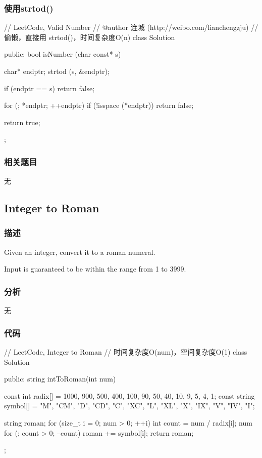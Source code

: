 \subsubsection{使用strtod()}
\begin{Code}
	// LeetCode, Valid Number
	// @author 连城 (http://weibo.com/lianchengzju)
	// 偷懒，直接用 strtod()，时间复杂度O(n)
	class Solution {
		public:
		bool isNumber (char const* s) {
			char* endptr;
			strtod (s, &endptr);
			
			if (endptr == s) return false;
			
			for (; *endptr; ++endptr)
			if (!isspace (*endptr)) return false;
			
			return true;
		}
	};
\end{Code}


\subsubsection{相关题目}
\begindot
\item 无
\myenddot


\subsection{Integer to Roman} %
\label{sec:integer-to-roman}


\subsubsection{描述}
Given an integer, convert it to a roman numeral.

Input is guaranteed to be within the range from 1 to 3999.


\subsubsection{分析}
无


\subsubsection{代码}
\begin{Code}
	// LeetCode, Integer to Roman
	// 时间复杂度O(num)，空间复杂度O(1)
	class Solution {
		public:
		string intToRoman(int num) {
			const int radix[] = {1000, 900, 500, 400, 100, 90,
				50, 40, 10, 9, 5, 4, 1};
			const string symbol[] = {"M", "CM", "D", "CD", "C", "XC",
				"L", "XL", "X", "IX", "V", "IV", "I"};
			
			string roman;
			for (size_t i = 0; num > 0; ++i) {
				int count = num / radix[i];
				num %
				for (; count > 0; --count) roman += symbol[i];
			}
			return roman;
		}
	};
\end{Code}


